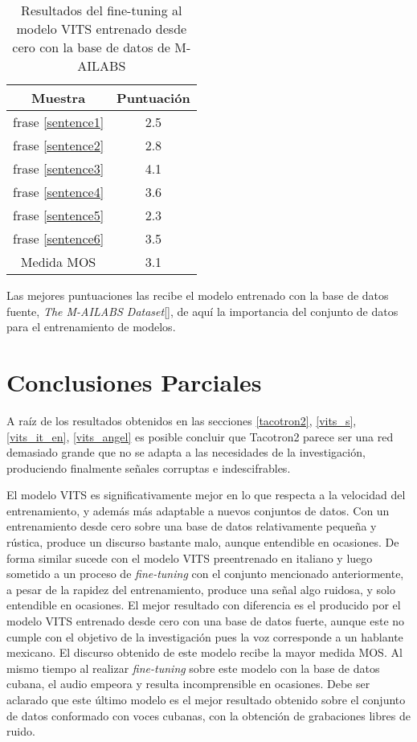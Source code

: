 \begin{table}[H]
	\begin{center} 
		\begin{tabular}{ |c|c| } 
			\hline
			Muestra & Puntuación \\
			\hline
			frase \ref{sentence1} & 2.5 \\
			frase \ref{sentence2} & 2.8 \\
			frase \ref{sentence3} & 4.1 \\
			frase \ref{sentence4} & 3.6 \\
			frase \ref{sentence5} & 2.3 \\
			frase \ref{sentence6} & 3.5 \\
			\hline
			Medida MOS & 3.1\\
			\hline
		\end{tabular}
		\caption{Resultados del fine-tuning al modelo VITS entrenado desde cero con la base de datos de M-AILABS} 
	\end{center}
\end{table}

Las mejores puntuaciones las recibe el modelo entrenado con la base de datos fuente, \textit{The M-AILABS Dataset}[\cite{mailabs}], de aquí la importancia del conjunto de datos para el entrenamiento de modelos.\\

\section{Conclusiones Parciales}

A raíz de los resultados obtenidos en las secciones \ref{tacotron2}, \ref{vits_s}, \ref{vits_it_en}, \ref{vits_angel} es posible concluir que Tacotron2 parece ser una red demasiado grande que no se adapta a las necesidades de la investigación, produciendo finalmente señales corruptas e indescifrables.

El modelo VITS es significativamente mejor en lo que respecta a la velocidad del entrenamiento, y además más adaptable a nuevos conjuntos de datos. Con un entrenamiento desde cero sobre una base de datos relativamente pequeña y rústica, produce un discurso bastante malo, aunque entendible en ocasiones. De forma similar sucede con el modelo VITS preentrenado en italiano y luego sometido a un proceso de \textit{fine-tuning} con el conjunto mencionado anteriormente, a pesar de la rapidez del entrenamiento, produce una señal algo ruidosa, y solo entendible en ocasiones. El mejor resultado con diferencia es el producido por el modelo VITS entrenado desde cero con una base de datos fuerte, aunque este no cumple con el objetivo de la investigación pues la voz corresponde a un hablante mexicano. El discurso obtenido de este modelo recibe la mayor medida MOS. Al mismo tiempo al realizar \textit{fine-tuning} sobre este modelo con la base de datos cubana, el audio empeora y resulta incomprensible en ocasiones. Debe ser aclarado que este último modelo es el mejor resultado obtenido sobre el conjunto de datos conformado con voces cubanas, con la obtención de grabaciones libres de ruido. 





